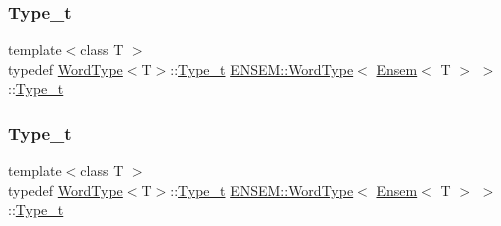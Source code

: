 \subsubsection{\texorpdfstring{Type\_t}{Type\_t}\hspace{0.1cm}{\footnotesize\ttfamily [1/3]}}
{\footnotesize\ttfamily template$<$class T $>$ \\
typedef \mbox{\hyperlink{structENSEM_1_1WordType}{Word\+Type}}$<$T$>$\+::\mbox{\hyperlink{structENSEM_1_1WordType_3_01Ensem_3_01T_01_4_01_4_af525fac697967b39c1ab3356734aeed7}{Type\+\_\+t}} \mbox{\hyperlink{structENSEM_1_1WordType}{E\+N\+S\+E\+M\+::\+Word\+Type}}$<$ \mbox{\hyperlink{classENSEM_1_1Ensem}{Ensem}}$<$ T $>$ $>$\+::\mbox{\hyperlink{structENSEM_1_1WordType_3_01Ensem_3_01T_01_4_01_4_af525fac697967b39c1ab3356734aeed7}{Type\+\_\+t}}}

\mbox{\label{structENSEM_1_1WordType_3_01Ensem_3_01T_01_4_01_4_af525fac697967b39c1ab3356734aeed7}} 
\subsubsection{\texorpdfstring{Type\_t}{Type\_t}\hspace{0.1cm}{\footnotesize\ttfamily [2/3]}}
{\footnotesize\ttfamily template$<$class T $>$ \\
typedef \mbox{\hyperlink{structENSEM_1_1WordType}{Word\+Type}}$<$T$>$\+::\mbox{\hyperlink{structENSEM_1_1WordType_3_01Ensem_3_01T_01_4_01_4_af525fac697967b39c1ab3356734aeed7}{Type\+\_\+t}} \mbox{\hyperlink{structENSEM_1_1WordType}{E\+N\+S\+E\+M\+::\+Word\+Type}}$<$ \mbox{\hyperlink{classENSEM_1_1Ensem}{Ensem}}$<$ T $>$ $>$\+::\mbox{\hyperlink{structENSEM_1_1WordType_3_01Ensem_3_01T_01_4_01_4_af525fac697967b39c1ab3356734aeed7}{Type\+\_\+t}}}

\mbox{\label{structENSEM_1_1WordType_3_01Ensem_3_01T_01_4_01_4_af525fac697967b39c1ab3356734aeed7}} 
